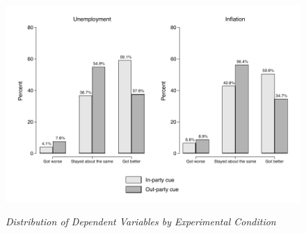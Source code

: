 \documentclass[12pt, letterpaper]{article}
\begin{document}
\begin{center}
\begin{figure}[H]
  \centering
  \caption{\textit{Distribution of Dependent Variables by Experimental Condition}}
  \includegraphics[width=\textwidth]{../figs/combined_nontroll.pdf}
  \label{fig:combined_exp}
\end{figure}
\end{center}

\vspace{-2.5cm}
\end{document}
